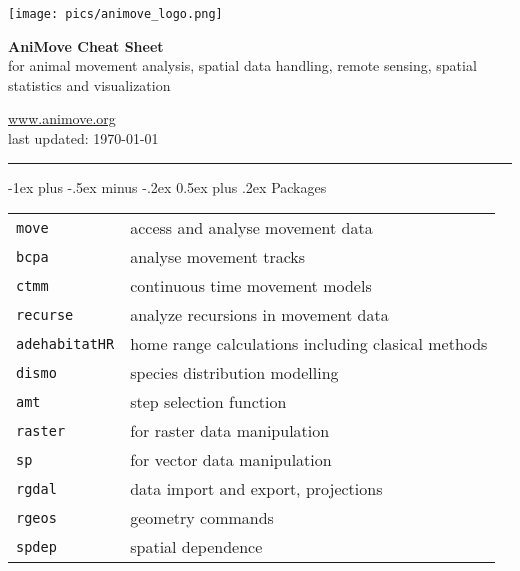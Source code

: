 \documentclass[a4paper,10pt,landscape]{article}
\makeatletter
\renewcommand{\section}{\@startsection{section}{1}{0mm}%
                                {-1ex plus -.5ex minus -.2ex}%
                                {0.5ex plus .2ex}%
                                {\normalfont\large\bfseries}}
\makeatother
\begin{document}
\newlength{\MyLen}


\raggedright
\footnotesize
\begin{multicols}{3}


\setlength{\premulticols}{1pt}
\setlength{\postmulticols}{1pt}
\setlength{\multicolsep}{1pt}
\setlength{\columnsep}{2pt}
  
\begin{center}
	 \texttt{[image: pics/animove\_logo.png]}
     
     \Large{\textbf{AniMove Cheat Sheet}} \\
     for animal movement analysis, spatial data handling, remote sensing, spatial statistics and visualization
     
\end{center}



\url{www.animove.org}\\
last updated: \today

\rule{0.32\textwidth}{0.4pt}


\section{Packages}
\begin{tabular}{@{}p{\the\MyLen}%
		@{}p{\linewidth-\the\MyLen}@{}}
\verb!move!  & access and analyse movement data\\
\verb!bcpa!  & analyse movement tracks\\
\verb!ctmm!  &  continuous time movement models\\
\verb!recurse!  & analyze recursions in movement data\\
\verb!adehabitatHR! & home range calculations including clasical methods\\
\verb!dismo!  &  species distribution modelling \\
\verb!amt!  &  step selection function \\
\verb!raster!    & for raster data manipulation \\
\verb!sp!     & for vector data manipulation \\
\verb!rgdal!  & data import and export, projections \\
\verb!rgeos!  & geometry commands \\
\verb!spdep!  & spatial dependence \\


\end{tabular}
\end{multicols}
\end{document}

